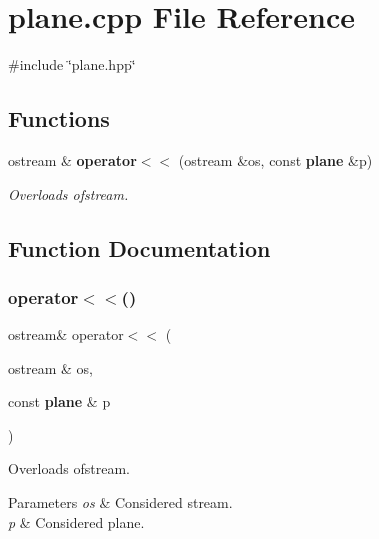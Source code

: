 \section{plane.\+cpp File Reference}
\label{plane_8cpp}
{\ttfamily \#include \char`\"{}plane.\+hpp\char`\"{}}\newline
\subsection*{Functions}
\begin{DoxyCompactItemize}
\item 
ostream \& \textbf{ operator$<$$<$} (ostream \&os, const \textbf{ plane} \&p)
\begin{DoxyCompactList}\small\item\em Overloads ofstream. \end{DoxyCompactList}\end{DoxyCompactItemize}


\subsection{Function Documentation}
\mbox{\label{plane_8cpp_ad9726324e2752901973bf9cdc8ae8c39}} 
\subsubsection{operator$<$$<$()}
{\footnotesize\ttfamily ostream\& operator$<$$<$ (\begin{DoxyParamCaption}\item[{ostream \&}]{os,  }\item[{const \textbf{ plane} \&}]{p }\end{DoxyParamCaption})}



Overloads ofstream. 


\begin{DoxyParams}{Parameters}
{\em os} & Considered stream. \\
\hline
{\em p} & Considered plane. \\
\hline
\end{DoxyParams}
